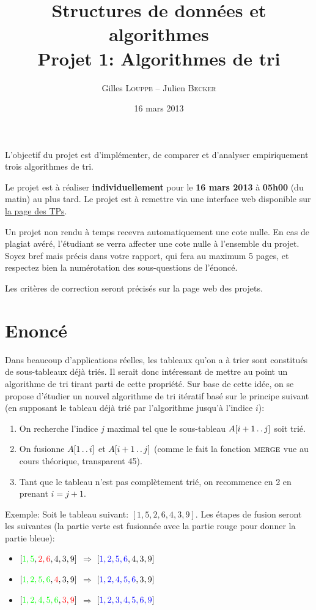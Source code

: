 \documentclass[a4paper,10pt]{article}
\title{
    \textbf{Structures de données et algorithmes}\\
    Projet 1: Algorithmes de tri
}
\author{Gilles \textsc{Louppe} -- Julien \textsc{Becker}}
\date{16 mars 2013}
\begin{document}
\maketitle

L'objectif du projet est d'implémenter, de comparer et d'analyser empiriquement
trois algorithmes de tri.

Le projet est à réaliser {\bf individuellement} pour le {\bf 16 mars 2013} à
{\bf 05h00} (du matin) au plus tard. Le projet est à remettre via une interface
web disponible sur \href{http://www.montefiore.ulg.ac.be/~glouppe/2012-2013/students.info0902.php}{la page des TPs}.

Un projet non rendu à temps recevra automatiquement une cote nulle. En
cas de plagiat avéré, l'étudiant se verra affecter une cote nulle à
l'ensemble du projet. Soyez bref mais précis dans votre rapport, qui
fera au maximum 5 pages, et respectez bien la numérotation des
sous-questions de l'énoncé.

Les critères de correction seront précisés sur la page web des
projets.

\section{Enoncé}

Dans beaucoup d'applications réelles, les tableaux qu'on a à trier
sont constitués de sous-tableaux déjà triés. Il serait donc
intéressant de mettre au point un algorithme de tri tirant parti de
cette propriété. Sur base de cette idée, on se propose d'étudier un
nouvel algorithme de tri itératif basé sur le principe suivant (en
supposant le tableau déjà trié par l'algorithme jusqu'à l'indice $i$):
\begin{enumerate}
\item On recherche l'indice $j$ maximal tel que le sous-tableau $A[i+1\mathinner{\ldotp\ldotp} j]$ soit trié.
\item On fusionne $A[1\mathinner{\ldotp\ldotp} i]$ et $A[i+1 \mathinner{\ldotp\ldotp} j]$ (comme le
  fait la fonction $\textnormal{\scshape merge}$ vue au cours théorique, transparent
  45).
\item Tant que le tableau n'est pas complètement trié, on recommence
  en 2 en prenant $i=j+1$.
\end{enumerate}

\bigskip

Exemple: Soit le tableau suivant: $[1,5,2,6,4,3,9]$. Les étapes de
fusion seront les suivantes (la partie verte est fusionnée avec la
partie rouge pour donner la partie bleue):
\begin{itemize}
\item $[{\color{green} 1,5},{\color{red} 2,6},4,3,9]$ $\Rightarrow$ $[{\color{blue} 1,2,5,6},4,3,9]$
\item $[{\color{green} 1,2,5,6},{\color{red}4},3,9]$ $\Rightarrow$ $[{\color{blue} 1,2,4,5,6},3,9]$
\item $[{\color{green} 1,2,4,5,6},{\color{red} 3,9}]$ $\Rightarrow$ $[{\color{blue} 1,2,3,4,5,6,9}]$
\end{itemize}
\end{document}
